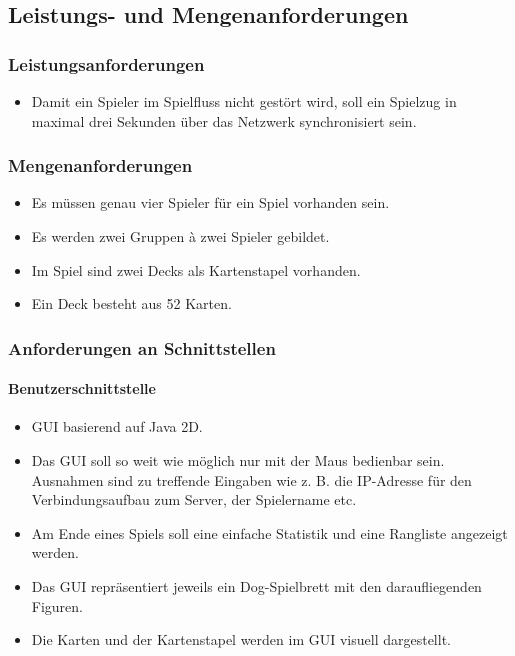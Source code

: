\documentclass[a4paper,12pt,halfparskip,DIV14]{scrartcl}
\begin{document}
\subsection{Leistungs- und Mengenanforderungen}\label{sub:leistungs_und_mengenanforderungen} %
\subsubsection{Leistungsanforderungen}\label{ssub:leistungsanforderungen} %
\begin{itemize}
	\item Damit ein Spieler im Spielfluss nicht gestört wird, soll ein Spielzug in maximal drei Sekunden über das Netzwerk synchronisiert sein.
\end{itemize}
\subsubsection{Mengenanforderungen}\label{ssub:mengenanforderungen} %
\begin{itemize}
	\item Es müssen genau vier Spieler für ein Spiel vorhanden sein.
	\item Es werden zwei Gruppen à zwei Spieler gebildet.
	\item Im Spiel sind zwei Decks als Kartenstapel vorhanden.
	\item Ein Deck besteht aus 52 Karten.
\end{itemize}

\subsubsection{Anforderungen an Schnittstellen}\label{ssub:anforderungen_an_schnittstellen} %
\paragraph{Benutzerschnittstelle}\label{ssub:benutzerschnittstelle} %
\begin{itemize}
	\item GUI basierend auf Java 2D.
	\item Das GUI soll so weit wie möglich nur mit der Maus bedienbar sein. Ausnahmen sind zu treffende Eingaben wie z. B. die IP-Adresse für den Verbindungsaufbau zum Server, der Spielername etc.
	\item Am Ende eines Spiels soll eine einfache Statistik und eine Rangliste angezeigt werden.
	\item Das GUI repräsentiert jeweils ein Dog-Spielbrett mit den daraufliegenden Figuren.
	\item Die Karten und der Kartenstapel werden im GUI visuell dargestellt.
\end{itemize}
\end{document}
